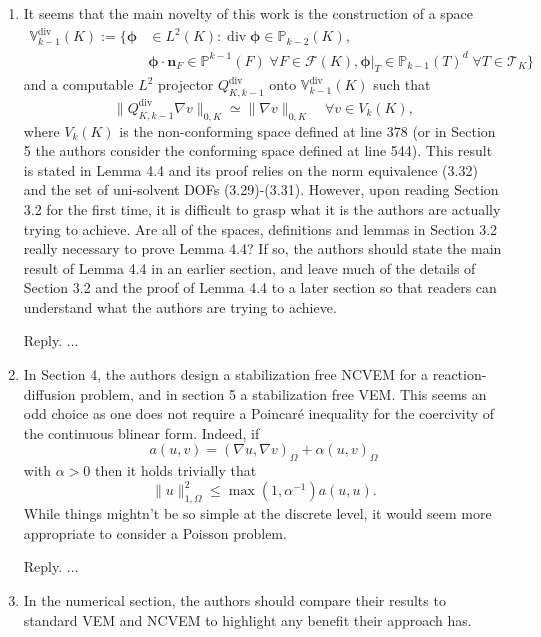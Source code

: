 \documentclass[10pt]{amsart}
\theoremstyle{definition}
\theoremstyle{remark}
\renewcommand{\div}{\operatorname{div}}
\begin{document}
\begin{enumerate}[1.]
\item \textsf{It seems that the main novelty of this work is the construction of a space
\begin{align*}
\mathbb V_{k-1}^{\div}(K):=\{\boldsymbol{\phi}&\in L^2(K): \div\boldsymbol{\phi}\in\mathbb P_{k-2}(K), \\
& \boldsymbol{\phi}\cdot\boldsymbol{n}_F\in\mathbb P^{k-1}(F)\;\forall F\in\mathcal F(K), \boldsymbol{\phi}|_T\in\mathbb P_{k-1}(T)^d\;\forall T\in\mathcal T_K
\}
\end{align*}
and a computable $L^2$ projector $Q_{K,k-1}^{\div}$ onto $\mathbb V_{k-1}^{\div}(K)$ such that
$$
\|Q_{K,k-1}^{\div}\nabla v\|_{0,K}\simeq \|\nabla v\|_{0,K} \quad\forall v\in V_k(K),
$$
where $V_k(K)$ is the non-conforming space defined at line 378 (or in Section 5 the authors consider the conforming space defined at line 544). This result is stated in Lemma 4.4 and its proof relies on the norm equivalence (3.32) and the set of uni-solvent DOFs (3.29)-(3.31). However, upon reading Section 3.2 for the first time, it is difficult to grasp what it is the authors are actually trying to achieve. Are all of the spaces, definitions and lemmas in Section 3.2 really necessary to prove Lemma 4.4? If so, the authors should state the main result of Lemma 4.4 in an earlier section, and leave much of the details of Section 3.2 and the proof of Lemma 4.4 to a later section so that readers can understand what the authors are trying to achieve.}

\smallskip \noindent \textcolor[rgb]{1.00,0.00,0.00}{Reply.}
...

\medskip

\item \textsf{In Section 4, the authors design a stabilization free NCVEM for a reaction-diffusion problem, and in section 5 a stabilization free VEM. This seems an odd choice as one does not require a Poincar\'e inequality for the coercivity of the continuous blinear form. Indeed, if
$$
a(u, v)=(\nabla u, \nabla v)_{\Omega}+\alpha (u, v)_{\Omega}
$$
with $\alpha > 0$ then it holds trivially that
$$
\|u\|_{1,\Omega}^2\leq\max(1,\alpha^{-1})a(u,u).
$$
While things mightn't be so simple at the discrete level, it would seem more
appropriate to consider a Poisson problem.}

\smallskip \noindent \textcolor[rgb]{1.00,0.00,0.00}{Reply.}
...

\medskip

\item \textsf{In the numerical section, the authors should compare their results to standard VEM and NCVEM to highlight any benefit their approach has.}


\end{enumerate}
\end{document}
